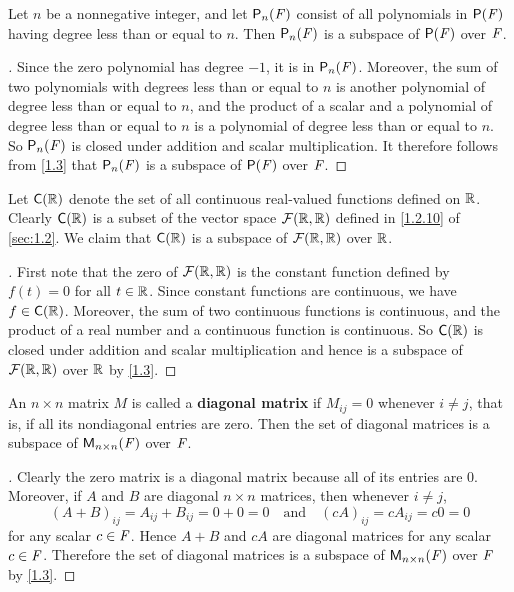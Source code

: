 \begin{eg}\label{1.3.6}
	Let \(n\) be a nonnegative integer, and let \(\ps[n]{\F}\) consist of all polynomials in \(\ps{\F}\) having degree less than or equal to \(n\).
	Then \(\ps[n]{\F}\) is a subspace of \(\ps{\F}\) over \(\mathit{F}\).
\end{eg}

\begin{proof}[]
	Since the zero polynomial has degree \(-1\), it is in \(\ps[n]{\F}\).
	Moreover, the sum of two polynomials with degrees less than or equal to \(n\) is another polynomial of degree less than or equal to \(n\), and the product of a scalar and a polynomial of degree less than or equal to \(n\) is a polynomial of degree less than or equal to \(n\).
	So \(\ps[n]{\F}\) is closed under addition and scalar multiplication.
	It therefore follows from \cref{1.3} that \(\ps[n]{\F}\) is a subspace of \(\ps{\F}\) over \(\mathit{F}\).
\end{proof}

\begin{eg}\label{1.3.7}
	Let \(\cfs(\R)\) denote the set of all continuous real-valued functions defined on \(\mathbb{R}\).
	Clearly \(\cfs(\R)\) is a subset of the vector space \(\mathcal{F}(\mathbb{R}, \mathbb{R})\) defined in \cref{1.2.10} of \cref{sec:1.2}.
	We claim that \(\cfs(\R)\) is a subspace of \(\mathcal{F}(\mathbb{R}, \mathbb{R})\) over \(\mathbb{R}\).
\end{eg}

\begin{proof}[]
	First note that the zero of \(\mathcal{F}(\mathbb{R}, \mathbb{R})\) is the constant function defined by \(f(t) = 0\) for all \(t \in \mathbb{R}\).
	Since constant functions are continuous, we have \(f \in \cfs(\R)\).
	Moreover, the sum of two continuous functions is continuous, and the product of a real number and a continuous function is continuous.
	So \(\cfs(\R)\) is closed under addition and scalar multiplication and hence is a subspace of \(\mathcal{F}(\mathbb{R}, \mathbb{R})\) over \(\mathbb{R}\) by \cref{1.3}.
\end{proof}

\begin{eg}\label{1.3.8}
	An \(n \times n\) matrix \(M\) is called a \textbf{diagonal matrix} if \(M_{i j} = 0\) whenever \(i \neq j\), that is, if all its nondiagonal entries are zero.
	Then the set of diagonal matrices is a subspace of \(\mathsf{M}_{{n} \times n}({\mathit{F}})\) over \(\mathit{F}\).
\end{eg}

\begin{proof}[]
	Clearly the zero matrix is a diagonal matrix because all of its entries are \(0\).
	Moreover, if \(A\) and \(B\) are diagonal \(n \times n\) matrices, then whenever \(i \neq j\),
	\[
		(A + B)_{i j} = A_{i j} + B_{i j} = 0 + 0 = 0 \quad \text{and} \quad (cA)_{i j} = cA_{i j} = c0 = 0
	\]
	for any scalar \(c \in \mathit{F}\).
	Hence \(A + B\) and \(cA\) are diagonal matrices for any scalar \(c \in \mathit{F}\).
	Therefore the set of diagonal matrices is a subspace of \(\mathsf{M}_{{n} \times n}({\mathit{F}})\) over \(\mathit{F}\) by \cref{1.3}.
\end{proof}

